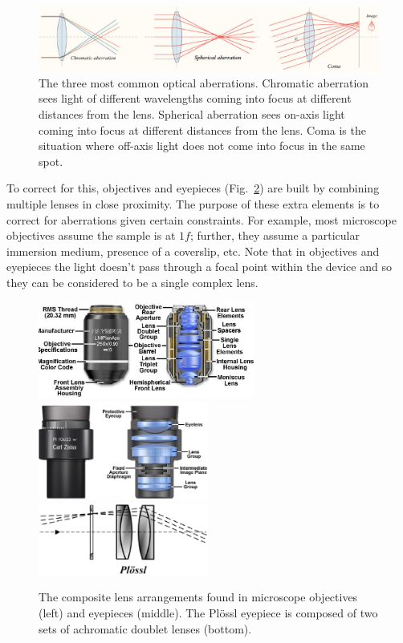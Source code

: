 \documentclass[a4paper]{report}
\begin{document}
\begin{figure}[h]
\center
\includegraphics[width=6in]{aberrations.eps}
\caption{The three most common optical aberrations. 
Chromatic aberration sees light of different wavelengths coming into focus at different distances from the lens.
Spherical aberration sees on-axis light coming into focus at different distances from the lens. 
Coma is the situation where off-axis light does not come into focus in the same spot. }
\label{fig:aberrations}
\end{figure}

To correct for this, objectives and eyepieces (Fig.~\ref{fig:composite}) are built by combining multiple lenses in close proximity. 
The purpose of these extra elements is to correct for aberrations given certain constraints. 
For example, most microscope objectives assume the sample is at $1f$; further, they assume a particular immersion medium, presence of a coverslip, etc.
Note that in objectives and eyepieces the light doesn't pass through a focal point within the device and so they can be considered to be a single complex lens.

\begin{figure}[h]
\center
\includegraphics[width=2.8in]{objectivesfigure1.eps}
\includegraphics[width=2.2in]{eyepieces5.eps}
\includegraphics[width=2.2in]{Plossl.eps}
\caption{The composite lens arrangements found in microscope
  objectives (left) and eyepieces (middle).
  The Pl\"{o}ssl eyepiece is composed of two sets of achromatic doublet lenses (bottom).}
\label{fig:composite}
\end{figure}
\end{document}
